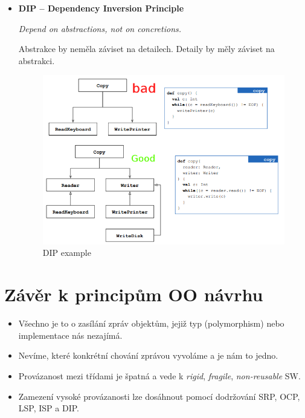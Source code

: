 \documentclass{szzclass}
\begin{document}
\begin{itemize}
      \item \textbf{DIP -- Dependency Inversion Principle}
      
      \textit{Depend on abstractions, not on concretions.}

      Abstrakce by neměla záviset na detailech. Detaily by měly záviset na abstrakci.
      \begin{figure}[ht]
            \centering
            \includegraphics[width=1\textwidth]{topics/bi-wsi-si-9/dip.png}
            \caption{DIP example}
      \end{figure}


\end{itemize}

\section{Závěr k principům OO návrhu}

\begin{itemize}
      \item Všechno je to o zasílání zpráv objektům, jejiž typ (polymorphism) nebo implementace nás nezajímá.
      \item Nevíme, které konkrétní chování zprávou vyvoláme a je nám to jedno.
      \item Provázanost mezi třídami je špatná a vede k \textit{rigid}, \textit{fragile}, \textit{non-reusable} SW.
      \item Zamezení vysoké provázanosti lze dosáhnout pomocí dodržování SRP, OCP, LSP, ISP a DIP.
\end{itemize}
\end{document}
